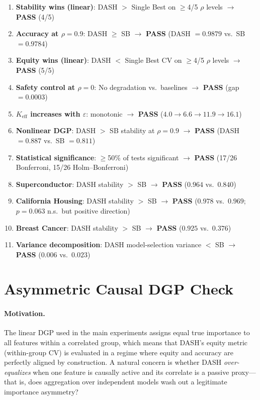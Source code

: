 \documentclass[11pt]{article}
\newcommand{\dash}{\textsc{DASH}}
\newcommand{\rhovar}{\rho}
\begin{document}
\begin{samepage}
\begin{enumerate}
  \item \textbf{Stability wins (linear)}: DASH $>$ Single Best on $\geq$4/5
    $\rhovar$ levels $\to$ \textbf{PASS} (4/5)
  \item \textbf{Accuracy at $\rhovar = 0.9$}: DASH $\geq$ SB $\to$
    \textbf{PASS} (DASH $= 0.9879$ vs.\ SB $= 0.9784$)
  \item \textbf{Equity wins (linear)}: DASH $<$ Single Best CV on $\geq$4/5
    $\rhovar$ levels $\to$ \textbf{PASS} (5/5)
  \item \textbf{Safety control at $\rhovar = 0$}: No degradation vs.\
    baselines $\to$ \textbf{PASS} (gap $= 0.0003$)
  \item \textbf{$K_{\text{eff}}$ increases with $\varepsilon$}: monotonic
    $\to$ \textbf{PASS} ($4.0 \to 6.6 \to 11.9 \to 16.1$)
  \item \textbf{Nonlinear DGP}: DASH $>$ SB stability at $\rhovar = 0.9$
    $\to$ \textbf{PASS} (DASH $= 0.887$ vs.\ SB $= 0.811$)
  \item \textbf{Statistical significance}: $\geq$50\% of tests significant
    $\to$ \textbf{PASS} (17/26 Bonferroni, 15/26 Holm--Bonferroni)
  \item \textbf{Superconductor}: DASH stability $>$ SB $\to$ \textbf{PASS}
    ($0.964$ vs.\ $0.840$)
  \item \textbf{California Housing}: DASH stability $>$ SB $\to$ \textbf{PASS}
    ($0.978$ vs.\ $0.969$; $p = 0.063$ n.s.\ but positive direction)
  \item \textbf{Breast Cancer}: DASH stability $>$ SB $\to$ \textbf{PASS}
    ($0.925$ vs.\ $0.376$)
  \item \textbf{Variance decomposition}: DASH model-selection variance $<$ SB
    $\to$ \textbf{PASS} ($0.006$ vs.\ $0.023$)
\end{enumerate}
\end{samepage}


\section{Asymmetric Causal DGP Check}
\label{app:asymmetric}

\paragraph{Motivation.}
The linear DGP used in the main experiments assigns equal true importance
to all features within a correlated group, which means that \dash{}'s
equity metric (within-group CV) is evaluated in a regime where equity
and accuracy are perfectly aligned by construction.
A natural concern is whether \dash{} \emph{over-equalizes} when one
feature is causally active and its correlate is a passive proxy---that
is, does aggregation over independent models wash out a legitimate
importance asymmetry?
\end{document}
